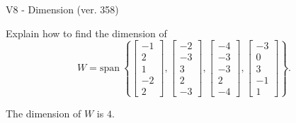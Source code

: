 \begin{exercise}
  \begin{exerciseTitle}V8 - Dimension (ver. 358)\end{exerciseTitle}
  \begin{exerciseStatement}
    Explain how to find the dimension of 
\[W=\mathrm{span}\ \left\{\left[\begin{array}{r}
-1 \\
2 \\
1 \\
-2 \\
2
\end{array}\right] , \left[\begin{array}{r}
-2 \\
-3 \\
3 \\
2 \\
-3
\end{array}\right] , \left[\begin{array}{r}
-4 \\
-3 \\
-3 \\
2 \\
-4
\end{array}\right] , \left[\begin{array}{r}
-3 \\
0 \\
3 \\
-1 \\
1
\end{array}\right]\right\}.\]



  \end{exerciseStatement}
  \begin{exerciseAnswer}
   The dimension of \(W\) is  \(4\).
  


  \end{exerciseAnswer}
\end{exercise}